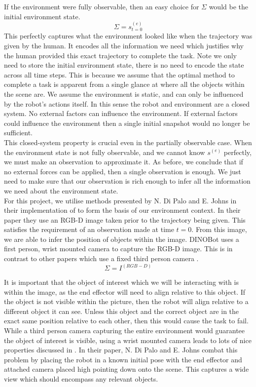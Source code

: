 If the environment were fully observable, then an easy choice for $\Sigma$ would be the initial environment state.
$$\Sigma = s^{(e)}_{t=0}$$
This perfectly captures what the environment looked like when the trajectory was given by the human. It encodes all the information we need which justifies why the human provided this exact trajectory to complete the task. Note we only need to store the initial environment state, there is no need to encode the state across all time steps. This is because we assume that the optimal method to complete a task is apparent from a single glance at where all the objects within the scene are. We assume the environment is static, and can only be influenced by the robot's actions itself. In this sense the robot and environment are a closed system. No external factors can influence the environment. If external factors could influence the environment then a single initial snapshot would no longer be sufficient.\\

This closed-system property is crucial even in the partially observable case. When the environment state is not fully observable, and we cannot know $s^{(e)}$ perfectly, we must make an observation to approximate it. As before, we conclude that if no external forces can be applied, then a single observation is enough. We just need to make sure that our observation is rich enough to infer all the information we need about the environment state.\\

For this project, we utilise methods presented by N. Di Palo and E. Johns in their implementation of  \cite{one-shot-imitation} to form the basis of our environment context. In their paper they use an RGB-D image taken prior to the trajectory being given. This satisfies the requirement of an observation made at time $t=0$. From this image, we are able to infer the position of objects within the image. DINOBot uses a first person, wrist mounted camera to capture the RGB-D image. This is in contrast to other papers which use a fixed third person camera \cite{one-shot-pose-estimate}.
$$\Sigma = I^{(RGB-D)}$$

It is important that the object of interest which we will be interacting with is within the image, as the end effector will need to align relative to this object. If the object is not visible within the picture, then the robot will align relative to a different object it can see. Unless this object and the correct object are in the exact same position relative to each other, then this would cause the task to fail. While a third person camera capturing the entire environment would guarantee the object of interest is visible, using a wrist mounted camera leads to lots of nice properties discussed in . In their paper, N. Di Palo and E. Johns combat this problem by placing the robot in a known initial pose with the end effector and attached camera placed high pointing down onto the scene. This captures a wide view which should encompass any relevant objects.\\

